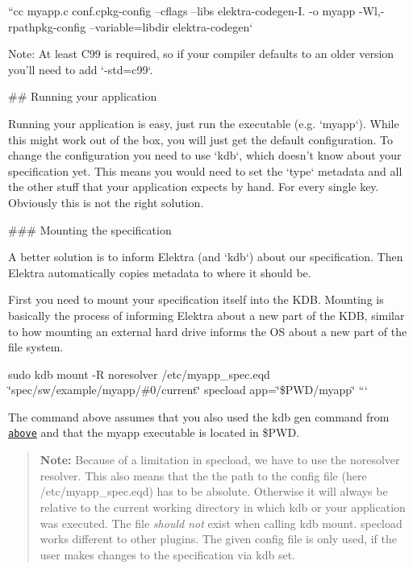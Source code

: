 ``{\ttfamily  cc myapp.\+c conf.\+c}pkg-\/config --cflags --libs elektra-\/codegen{\ttfamily -\/I. -\/o myapp -\/\+Wl,-\/rpath}pkg-\/config --variable=libdir elektra-\/codegen` 
\begin{DoxyCode}
Note: At least C99 is required, so if your compiler defaults to an older version you'll need to add
       `-std=c99`.

## Running your application

Running your application is easy, just run the executable (e.g. `myapp`). While this might work out of the
       box, you will just get the default
configuration. To change the configuration you need to use `kdb`, which doesn't know about your
       specification yet. This means you would need
to set the `type` metadata and all the other stuff that your application expects by hand. For every single
       key. Obviously this is not the
right solution.

### Mounting the specification

A better solution is to inform Elektra (and `kdb`) about our specification. Then Elektra automatically
       copies metadata to where it should be.

First you need to mount your specification itself into the KDB. Mounting is basically the process of
       informing Elektra about a new part of
the KDB, similar to how mounting an external hard drive informs the OS about a new part of the file system.
\end{DoxyCode}
 sudo kdb mount -\/R noresolver /etc/myapp\+\_\+spec.eqd \char`\"{}spec/sw/example/myapp/\#0/current\char`\"{} specload app=\char`\"{}\$\+P\+W\+D/myapp\char`\"{} ```

The command above assumes that you also used the {\ttfamily kdb gen} command from \href{#invoking-the-code-generator}{\tt above} and that the {\ttfamily myapp} executable is located in {\ttfamily \$\+P\+WD}.

\begin{quote}
{\bfseries Note\+:} Because of a limitation in {\ttfamily specload}, we have to use the {\ttfamily noresolver} resolver. This also means that the the path to the config file (here {\ttfamily /etc/myapp\+\_\+spec.eqd}) has to be absolute. Otherwise it will always be relative to the current working directory in which {\ttfamily kdb} or your application was executed. The file {\itshape should not} exist when calling {\ttfamily kdb mount}. {\ttfamily specload} works different to other plugins. The given config file is only used, if the user makes changes to the specification via {\ttfamily kdb set}. \end{quote}



